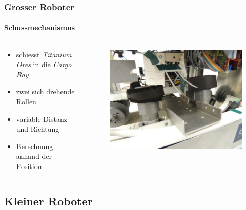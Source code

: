 \begin{frame}
	\frametitle{Grosser Roboter}
	\framesubtitle{Schussmechanismus}
		\begin{columns}
		\begin{column}{0.42 \textwidth}
			\begin{itemize}
				\item schiesst \textit{Titanium Ores} in die \textit{Cargo Bay}
				\item zwei sich drehende Rollen
				\item variable Distanz und Richtung
				\item Berechnung anhand der Position
			\end{itemize}
		\end{column}
		\begin{column}{0.58 \textwidth}
			\vspace{-2.8em}
			\begin{figure}[h]
				\centering
				\includegraphics[width = 1 \textwidth]{../images/presentation/schussmechanismus.jpg}
			\end{figure}
		\end{column}
	\end{columns}
\end{frame}

\subsection{Kleiner Roboter}

